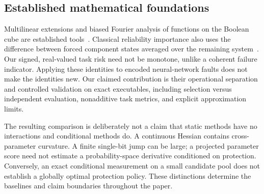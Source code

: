 \subsection{Established mathematical foundations}
Multilinear extensions and biased Fourier analysis of functions on the Boolean cube are established tools~\cite{odonnell2014analysis}. Classical reliability importance also uses the difference between forced component states averaged over the remaining system~\cite{rauzy2022reliability}. Our signed, real-valued task risk need not be monotone, unlike a coherent failure indicator. Applying these identities to encoded neural-network faults does not make the identities new. Our claimed contribution is their operational separation and controlled validation on exact executables, including selection versus independent evaluation, nonadditive task metrics, and explicit approximation limits.

The resulting comparison is deliberately not a claim that static methods have no interactions and conditional methods do. A continuous Hessian contains cross-parameter curvature. A finite single-bit jump can be large; a projected parameter score need not estimate a probability-space derivative conditioned on protection. Conversely, an exact conditional measurement on a small candidate pool does not establish a globally optimal protection policy. These distinctions determine the baselines and claim boundaries throughout the paper.
